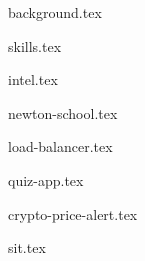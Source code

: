\documentclass[hidelinks,11pt]{article}
\begin{document}

{background.tex}



{skills.tex}



{intel.tex}

{newton-school.tex}



{load-balancer.tex}

{quiz-app.tex}

{crypto-price-alert.tex}




{sit.tex}
\end{document}
